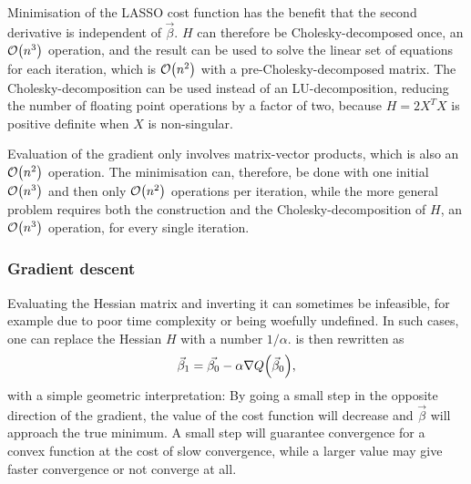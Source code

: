 \documentclass[11pt,british,a4paper]{article}
\numberwithin{equation}{section}
\begin{document}
Minimisation of the LASSO cost function has the benefit that the second derivative is independent of \(\vec{\beta}\).
\(H\) can therefore be Cholesky-decomposed once, an \(\mathcal{O}\qty(n^3)\) operation, and the result can be used to solve the linear set of equations for each iteration, which is \(\mathcal{O}\qty(n^2)\) with a pre-Cholesky-decomposed matrix.
The Cholesky-decomposition can be used instead of an LU-decomposition, reducing the number of floating point operations by a factor of two, because \(H=2X^T X\) is positive definite when \(X\) is non-singular.

Evaluation of the gradient only involves matrix-vector products, which is also an \(\mathcal{O}\qty(n^2)\) operation.
The minimisation can, therefore, be done with one initial \(\mathcal{O}\qty(n^3)\) and then only \(\mathcal{O}\qty(n^2)\) operations per iteration, while the more general problem requires both the construction and the Cholesky-decomposition of \(H\), an \(\mathcal{O}\qty(n^3)\) operation, for every single iteration.

\subsubsection{Gradient descent}
Evaluating the Hessian matrix and inverting it can sometimes be infeasible, for example due to poor time complexity or being woefully undefined.
In such cases, one can replace the Hessian \(H\) with a number \(1/\alpha\).
 is then rewritten as
\begin{equation}
    \vec{\beta}_1 = \vec{\beta_0} - \alpha \nabla Q\qty(\vec{\beta}_0),
\end{equation}
with a simple geometric interpretation:
By going a small step in the opposite direction of the gradient, the value of the cost function will decrease and \(\vec{\beta}\) will approach the true minimum.
A small step will guarantee convergence for a convex function at the cost of slow convergence, while a larger value may give faster convergence or not converge at all.


\clearpage
\nocite{*}
\printbibliography{}
\end{document}
